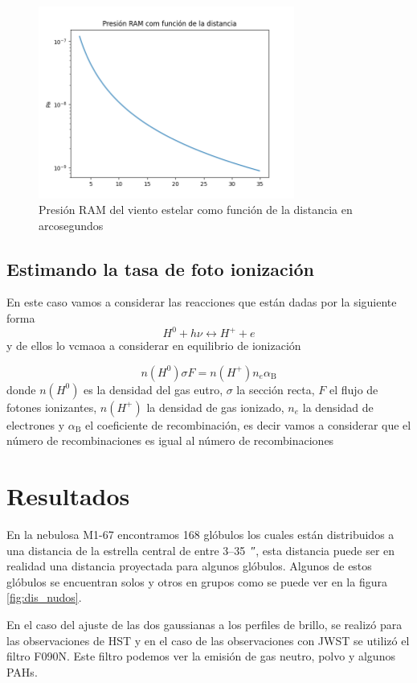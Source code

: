 \documentclass{book}
\begin{document}
\begin{figure}[h]
    \centering
    \includegraphics[width=0.75\textwidth]{images Chapter 3/C_3_presion_RAM.png}
    \caption{Presión RAM del viento estelar como función de la distancia en arcosegundos}
    \label{P_RAM}
\end{figure}

\section{Estimando la tasa de foto ionización}

En este caso vamos a considerar las reacciones que están dadas por la siguiente forma 
\[H^0+ h\nu \longleftrightarrow H^+ + e\]
y de ellos lo vcmaoa a considerar en equilibrio de ionización

\[n(H^0)\sigma F = n(H^+)n_e\alpha_\mathrm{B}\] donde $n(H^0)$ es la densidad del gas eutro, $\sigma$ la sección recta, $F$ el flujo de fotones ionizantes, $n(H^+)$ la densidad de gas ionizado, $n_e$ la densidad de electrones y $\alpha_\mathrm{B}$ el coeficiente de recombinación, es decir vamos a considerar que el número de recombinaciones es igual al  número de recombinaciones 

\chapter{Resultados}

En la nebulosa M1-67 encontramos 168 glóbulos los cuales están distribuidos a una distancia de la estrella central de entre 3--\SI{35}{\arcsecond}, esta distancia puede ser en realidad una distancia proyectada para algunos glóbulos. Algunos de estos glóbulos se encuentran solos y otros en grupos como se puede ver en la figura \ref{fig:dis_nudos}.

En el caso del ajuste de las dos gaussianas a los perfiles de brillo, se realizó para las observaciones de HST  y en el caso de las observaciones con JWST se utilizó el filtro F090N. Este filtro podemos ver la emisión de gas neutro, polvo y algunos PAHs.
\end{document}
